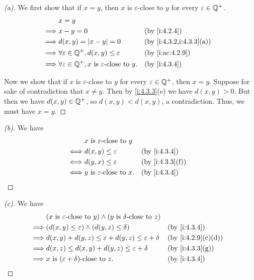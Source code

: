 \begin{proof}[(a)]
  We first show that if \(x = y\), then \(x\) is \(\varepsilon\)-close to \(y\) for every \(\varepsilon \in \mathbb{Q}^+\).
  \begin{align*}
             & x = y                                                                                                \\
    \implies & x - y = 0                                                               &  & \by{i:4.2.4}            \\
    \implies & d(x, y) = \abs{x - y} = 0                                               &  & \by{i:4.3.2,i:4.3.3}[a] \\
    \implies & \forall \varepsilon \in \Q^+, d(x, y) \leq \varepsilon                  &  & \by{i:ac:4.2.9}         \\
    \implies & \forall \varepsilon \in \Q^+, x \text{ is \(\varepsilon\)-close to } y. &  & \by{i:4.3.4}
  \end{align*}

  Now we show that if \(x\) is \(\varepsilon\)-close to \(y\) for every \(\varepsilon \in \mathbb{Q}^+\), then \(x = y\).
  Suppose for sake of contradiction that \(x \neq y\).
  Then by \cref{i:4.3.3}(e) we have \(d(x, y) > 0\).
  But then we have \(d(x, y) \in \mathbb{Q}^+\), so \(d(x, y) < d(x, y)\), a contradiction.
  Thus, we must have \(x = y\).
\end{proof}

\begin{proof}[(b)]
  We have
  \begin{align*}
         & x \text{ is \(\varepsilon\)-close to } y                       \\
    \iff & d(x, y) \leq \varepsilon                  &  & \by{i:4.3.4}    \\
    \iff & d(y, x) \leq \varepsilon                  &  & \by{i:4.3.3}[f] \\
    \iff & y \text{ is \(\varepsilon\)-close to } x. &  & \by{i:4.3.4}
  \end{align*}
\end{proof}

\begin{proof}[(c)]
  We have
  \begin{align*}
             & (x \text{ is \(\varepsilon\)-close to } y) \land (y \text{ is \(\delta\)-close to } z)                        \\
    \implies & \pa{d(x, y) \leq \varepsilon} \land \pa{d(y, z) \leq \delta}                           &  & \by{i:4.3.4}      \\
    \implies & d(x, y) + d(y, z) \leq \varepsilon + d(y, z) \leq \varepsilon + \delta                 &  & \by{i:4.2.9}[c,d] \\
    \implies & d(x, z) \leq d(x, y) + d(y, z) \leq \varepsilon + \delta                               &  & \by{i:4.3.3}[g]   \\
    \implies & x \text{ is \((\varepsilon + \delta)\)-close to } z.                                   &  & \by{i:4.3.4}
  \end{align*}
\end{proof}

